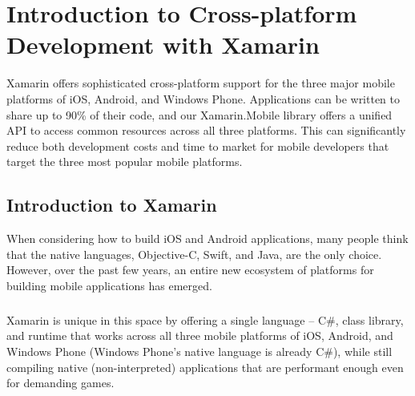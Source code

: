 
\chapter{Introduction to Cross-platform Development with Xamarin} %

\label{Chapter4} %


 Xamarin offers sophisticated cross-platform support for the three major mobile platforms of iOS, Android, and Windows Phone.
 Applications can be written to share up to 90\% of their code, and our Xamarin.Mobile library offers a unified API to access common resources across all three platforms.
 This can significantly reduce both development costs and time to market for mobile developers that target the three most popular mobile platforms.



 \section{Introduction to Xamarin}

 When considering how to build iOS and Android applications, many people think that the native languages, Objective-C, Swift, and Java, are the only choice. However, over the past few years, an entire new ecosystem of platforms for building mobile applications has emerged.


 \paragraph{}
 Xamarin is unique in this space by offering a single language – C\#, class library, and runtime that works across all three mobile platforms of iOS, Android, and Windows Phone (Windows Phone’s native language is already C\#), while still compiling native (non-interpreted) applications that are performant enough even for demanding games.


